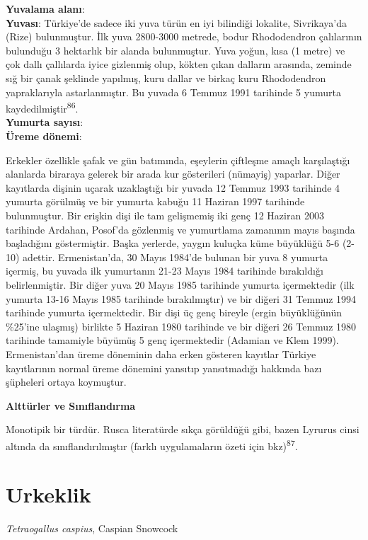 \documentclass[
  letterpaper,
  DIV=11,
  numbers=noendperiod]{scrreprt}
\begin{document}
\textbf{Yuvalama alanı}:\\
\textbf{Yuvası}: Türkiye'de sadece iki yuva türün en iyi bilindiği
lokalite, Sivrikaya'da (Rize) bulunmuştur. İlk yuva 2800-3000 metrede,
bodur Rhododendron çalılarının bulunduğu 3 hektarlık bir alanda
bulunmuştur. Yuva yoğun, kısa (1 metre) ve çok dallı çallılarda iyice
gizlenmiş olup, kökten çıkan dalların arasında, zeminde sığ bir çanak
şeklinde yapılmış, kuru dallar ve birkaç kuru Rhododendron yapraklarıyla
astarlanmıştır. Bu yuvada 6 Temmuz 1991 tarihinde 5 yumurta
kaydedilmiştir\textsuperscript{86}.\\
\textbf{Yumurta sayısı}:\\
\textbf{Üreme dönemi}:

Erkekler özellikle şafak ve gün batımında, eşeylerin çiftleşme amaçlı
karşılaştığı alanlarda biraraya gelerek bir arada kur gösterileri
(nümayiş) yaparlar. Diğer kayıtlarda dişinin uçarak uzaklaştığı bir
yuvada 12 Temmuz 1993 tarihinde 4 yumurta görülmüş ve bir yumurta kabuğu
11 Haziran 1997 tarihinde bulunmuştur. Bir erişkin dişi ile tam
gelişmemiş iki genç 12 Haziran 2003 tarihinde Ardahan, Posof'da
gözlenmiş ve yumurtlama zamanının mayıs başında başladığını
göstermiştir. Başka yerlerde, yaygın kuluçka küme büyüklüğü 5-6 (2-10)
adettir. Ermenistan'da, 30 Mayıs 1984'de bulunan bir yuva 8 yumurta
içermiş, bu yuvada ilk yumurtanın 21-23 Mayıs 1984 tarihinde bırakıldığı
belirlenmiştir. Bir diğer yuva 20 Mayıs 1985 tarihinde yumurta
içermektedir (ilk yumurta 13-16 Mayıs 1985 tarihinde bırakılmıştır) ve
bir diğeri 31 Temmuz 1994 tarihinde yumurta içermektedir. Bir dişi üç
genç bireyle (ergin büyüklüğünün \%25'ine ulaşmış) birlikte 5 Haziran
1980 tarihinde ve bir diğeri 26 Temmuz 1980 tarihinde tamamiyle büyümüş
5 genç içermektedir (Adamian ve Klem 1999). Ermenistan'dan üreme
döneminin daha erken gösteren kayıtlar Türkiye kayıtlarının normal üreme
dönemini yansıtıp yansıtmadığı hakkında bazı şüpheleri ortaya koymuştur.

\textbf{Alttürler ve Sınıflandırma}

Monotipik bir türdür. Rusca literatürde sıkça görüldüğü gibi, bazen
Lyrurus cinsi altında da sınıflandırılmıştır (farklı uygulamaların özeti
için bkz)\textsuperscript{87}.

\section{Urkeklik}\label{urkeklik}

\emph{Tetraogallus caspius}, Caspian Snowcock
\end{document}
